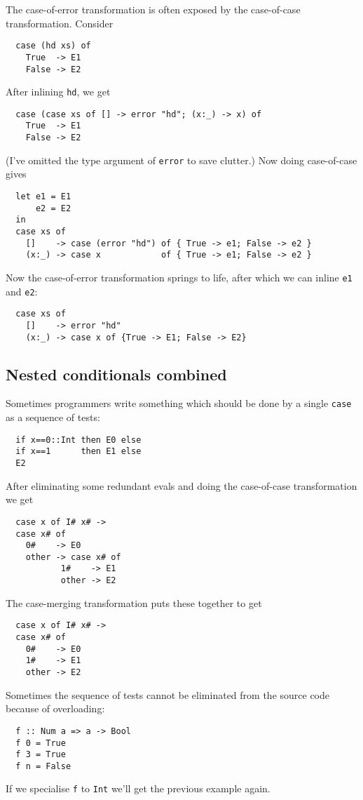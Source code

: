 \documentclass[11pt]{article}
\begin{document}
The case-of-error transformation is often exposed by the case-of-case
transformation.  Consider 
\begin{lstlisting}
  case (hd xs) of
	True  -> E1
	False -> E2
\end{lstlisting}
After inlining \texttt{hd}, we get
\begin{lstlisting}
  case (case xs of [] -> error "hd"; (x:_) -> x) of
	True  -> E1
	False -> E2
\end{lstlisting}
(I've omitted the type argument of \texttt{error} to save clutter.)
Now doing case-of-case gives
\begin{lstlisting}
  let e1 = E1
      e2 = E2
  in
  case xs of
	[]    -> case (error "hd") of { True -> e1; False -> e2 }
	(x:_) -> case x            of { True -> e1; False -> e2 }
\end{lstlisting}
Now the case-of-error transformation springs to life, after which
we can inline \texttt{e1} and \texttt{e2}:
\begin{lstlisting}
  case xs of
	[]    -> error "hd"
	(x:_) -> case x of {True -> E1; False -> E2}
\end{lstlisting}

\subsection{Nested conditionals combined}

Sometimes programmers write something which should be done
by a single \texttt{case} as a sequence of tests:
\begin{lstlisting}
  if x==0::Int then E0 else
  if x==1      then E1 else
  E2
\end{lstlisting}
After eliminating some redundant evals and doing the case-of-case
transformation we get
\begin{lstlisting}
  case x of I# x# ->
  case x# of
    0#    -> E0
    other -> case x# of 
	       1#    -> E1
	       other -> E2
\end{lstlisting} 
The case-merging transformation puts these together to get
\begin{lstlisting}
  case x of I# x# ->
  case x# of
    0#    -> E0
    1#    -> E1
    other -> E2
\end{lstlisting}
Sometimes the sequence of tests cannot be eliminated from the source
code because of overloading:
\begin{lstlisting}
  f :: Num a => a -> Bool
  f 0 = True
  f 3 = True
  f n = False
\end{lstlisting}
If we specialise \texttt{f} to \texttt{Int} we'll get the previous example again.
\end{document}
